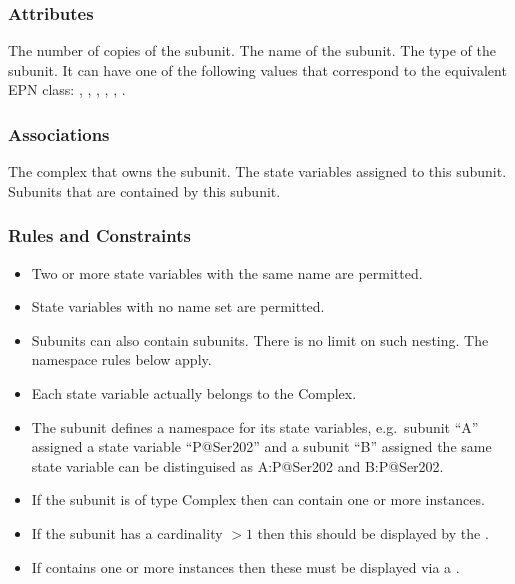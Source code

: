 \subsubsection{Attributes}

\begin{attributes}
   The number of copies of the subunit.
   The name of the subunit.
   The type of the subunit. It can have
  one of the following values that correspond to the equivalent EPN
  class: , ,
  , ,
  , .
\end{attributes}

\subsubsection{Associations}

\begin{attributes}
   The complex that owns the subunit.
   The state variables assigned
  to this subunit.
   Subunits that are contained by this subunit.
\end{attributes}

\subsubsection{Rules and Constraints}

\begin{itemize}
\item Two or more state variables with the same name are
  permitted.
\item State variables with no name set are permitted.
\item Subunits can also contain subunits. There is no limit on such nesting. The namespace rules
  below apply.
\item Each state variable actually belongs to the Complex.
\item The subunit defines a namespace for its state variables, e.g.\,
  subunit ``A'' assigned a state variable ``P@Ser202''  and a subunit
  ``B'' assigned the same state variable can be distinguised as
  A:P@Ser202 and B:P@Ser202.
\item If the subunit is of type Complex then  can contain one or
  more  instances.
\item If the subunit has a cardinality $>1$ then this should be
  displayed by the .
\item If  contains one or more instances then these
  must be displayed via a .
\end{itemize}

